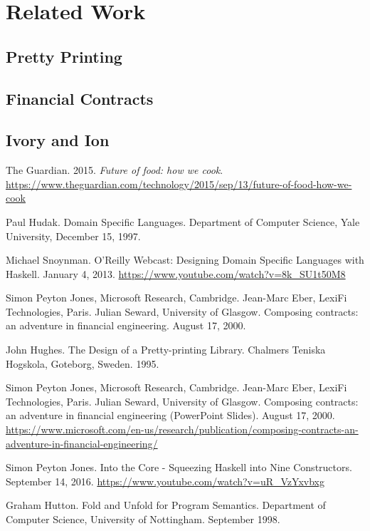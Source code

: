 \documentclass[11pt]{article}
\begin{document}
    \section{Related Work}
        \subsection{Pretty Printing}
        \subsection{Financial Contracts}
        \subsection{Ivory and Ion}
    \newpage

    \begin{thebibliography}{8}

        The Guardian. 2015. \textit{Future of food: how we cook}.
        \url{https://www.theguardian.com/technology/2015/sep/13/future-of-food-how-we-cook}

        Paul Hudak. Domain Specific Languages. Department of Computer
        Science, Yale University, December 15, 1997.

        Michael Snoynman. O'Reilly Webcast: Designing Domain Specific
        Languages with Haskell. January 4, 2013.
        \url{https://www.youtube.com/watch?v=8k_SU1t50M8}

        Simon Peyton Jones, Microsoft Research, Cambridge.
        Jean-Marc Eber, LexiFi Technologies, Paris. Julian Seward,
        University of Glasgow. Composing contracts: an adventure in
        financial engineering. August 17, 2000.

        John Hughes. The Design of a Pretty-printing Library.
        Chalmers Teniska Hogskola, Goteborg, Sweden. 1995.

        Simon Peyton Jones, Microsoft Research, Cambridge.
        Jean-Marc Eber, LexiFi Technologies, Paris. Julian Seward,
        University of Glasgow. Composing contracts: an adventure in
        financial engineering (PowerPoint Slides). August 17, 2000.
        \url{https://www.microsoft.com/en-us/research/publication/composing-contracts-an-adventure-in-financial-engineering/}

        Simon Peyton Jones. Into the Core - Squeezing Haskell into
        Nine Constructors. September 14, 2016.
        \url{https://www.youtube.com/watch?v=uR_VzYxvbxg}

        Graham Hutton. Fold and Unfold for Program Semantics. Department of
        Computer Science, University of Nottingham. September 1998.

    \end{thebibliography}   

    \newpage

    \appendix
\end{document}
